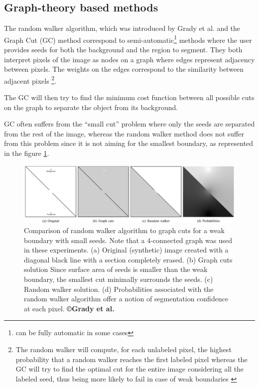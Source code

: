 \subsection{Graph-theory based methods}

The random walker algorithm, which was introduced by Grady et al. \cite{Grady2006} and the Graph Cut (GC) method correspond to
semi-automatic\footnote{can be fully automatic in some cases} methods where the user provides seeds for both the
background and the region to segment. They both interpret pixels of the
image as nodes on a graph where edges represent adjacency between
pixels. The weights on the edges correspond to the similarity between
adjacent pixels \footnote{The random walker will compute, 
for each unlabeled pixel, the highest probability 
that a random walker reaches the first labeled pixel 
whereas the GC will try to find the optimal cut for the entire image 
considering all the labeled seed, thus being more likely 
to fail in case of weak boundaries \cite{Grady2006}}.

The GC will then try to find the minimum cost function between all
possible cuts on the graph to separate the object from its background.

GC often suffers from the ``small cut'' problem where only the seeds are
separated from the rest of the image, whereas the random walker method
does not suffer from this problem since it is not aiming for the
smallest boundary, as represented in the figure \ref{Grady2006_Fig5}.

\begin{figure}[th!]
	\centering
	\includegraphics[width=0.8\linewidth]{images/Grady2005_Fig5_v3}
	\caption{Comparison of random walker algorithm to graph cuts for a weak boundary with small seeds. Note that a 4-connected graph was used in these experiments. (a) Original (synthetic) image created with a diagonal black line with a section completely erased. (b) Graph cuts solution Since surface area of seeds is smaller than the weak boundary, the smallest cut minimally surrounds the seeds. (c) Random walker solution. (d) Probabilities associated with the random walker algorithm offer a notion of segmentation confidence at each pixel. \textbf{©Grady et al. \cite{Grady2006}}}
	\label{Grady2006_Fig5}
\end{figure}


